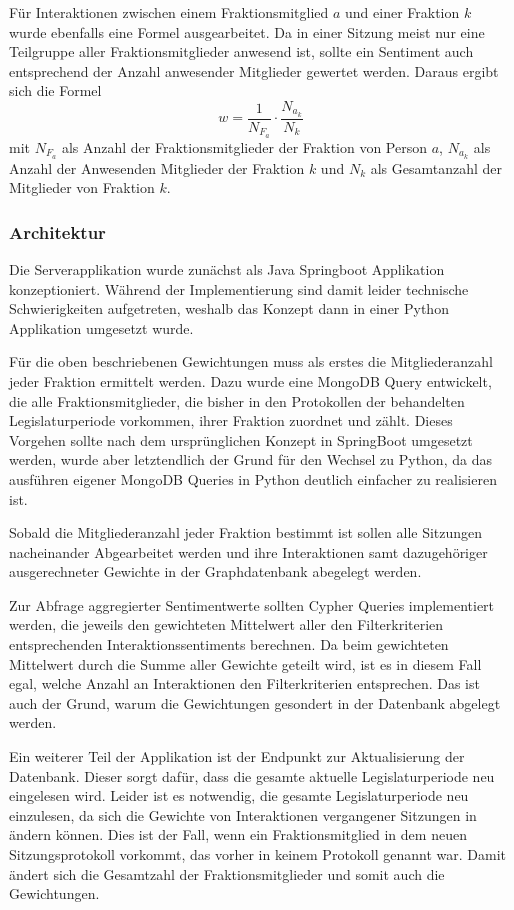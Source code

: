 Für Interaktionen zwischen einem Fraktionsmitglied $a$ und einer Fraktion $k$ wurde ebenfalls eine Formel ausgearbeitet. Da in einer Sitzung meist nur eine Teilgruppe aller Fraktionsmitglieder anwesend ist, sollte ein Sentiment auch entsprechend der Anzahl anwesender Mitglieder gewertet werden. Daraus ergibt sich die Formel
$$w=\frac{1}{N_{F_a}} \cdot \frac{N_{a_k}}{N_{k}}$$ mit $N_{F_a}$ als Anzahl der Fraktionsmitglieder der Fraktion von Person $a$, $N_{a_k}$ als Anzahl der Anwesenden Mitglieder der Fraktion $k$ und $N_{k}$ als Gesamtanzahl der Mitglieder von Fraktion $k$. 

\subsubsection{Architektur}
Die Serverapplikation wurde zunächst als Java Springboot Applikation konzeptioniert. Während der Implementierung sind damit leider technische Schwierigkeiten aufgetreten, weshalb das Konzept dann in einer Python Applikation umgesetzt wurde.

Für die oben beschriebenen Gewichtungen muss als erstes die Mitgliederanzahl jeder Fraktion ermittelt werden. Dazu wurde eine MongoDB Query entwickelt, die alle Fraktionsmitglieder, die bisher in den Protokollen der behandelten Legislaturperiode vorkommen, ihrer Fraktion zuordnet und zählt. Dieses Vorgehen sollte nach dem ursprünglichen Konzept in SpringBoot umgesetzt werden, wurde aber letztendlich der Grund für den Wechsel zu Python, da das ausführen eigener MongoDB Queries in Python deutlich einfacher zu realisieren ist.

Sobald die Mitgliederanzahl jeder Fraktion bestimmt ist sollen alle Sitzungen nacheinander Abgearbeitet werden und ihre Interaktionen samt dazugehöriger ausgerechneter Gewichte in der Graphdatenbank abegelegt werden.

Zur Abfrage aggregierter Sentimentwerte sollten Cypher Queries implementiert werden, die jeweils den gewichteten Mittelwert aller den Filterkriterien entsprechenden Interaktionssentiments berechnen. Da beim gewichteten Mittelwert durch die Summe aller Gewichte geteilt wird, ist es in diesem Fall egal, welche Anzahl an Interaktionen den Filterkriterien entsprechen. Das ist auch der Grund, warum die Gewichtungen gesondert in der Datenbank abgelegt werden.

Ein weiterer Teil der Applikation ist der Endpunkt zur Aktualisierung der Datenbank. Dieser sorgt dafür, dass die gesamte aktuelle Legislaturperiode neu eingelesen wird. Leider ist es notwendig, die gesamte Legislaturperiode neu einzulesen, da sich die Gewichte von Interaktionen vergangener Sitzungen in ändern können. Dies ist der Fall, wenn ein Fraktionsmitglied in dem neuen Sitzungsprotokoll vorkommt, das vorher in keinem Protokoll genannt war. Damit ändert sich die Gesamtzahl der Fraktionsmitglieder und somit auch die Gewichtungen.

